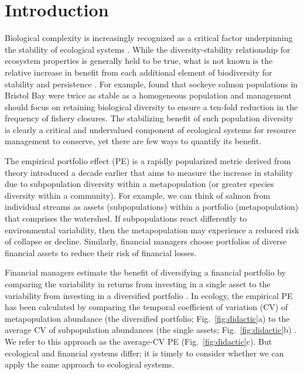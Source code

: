 
\section{Introduction}

Biological complexity is increasingly recognized as a critical factor
underpinning the stability of ecological systems
\citep[e.g.][]{hilborn2003, ives2007, schindler2010}.
While the diversity-stability relationship for ecosystem properties is
generally held to be true, what is not known is the relative increase in
benefit from each additional element of biodiversity for stability and
persistence \citep{cardinale2012}. For example,
\citet{schindler2010} found that sockeye salmon populations in Bristol Bay
were twice as stable as a homogeneous population and management should focus on
retaining biological diversity to ensure a ten-fold reduction in the frequency of
fishery closures. The stabilizing benefit of such population diversity is
clearly a critical and undervalued component of ecological systems for resource
management to conserve, yet there are few ways to quantify its benefit.

The empirical portfolio effect (PE) is a rapidly popularized metric
\citep[e.g.][]{schindler2010, carlson2011, iMCC2011} derived from
theory introduced a decade earlier \citep{doak1998, tilman1998,
tilman1999} that aims to measure the increase in stability due to
subpopulation diversity within a metapopulation (or greater species diversity
within a community). For example, we can think of salmon from individual streams
as assets (subpopulations) within a portfolio (metapopulation) that comprises
the watershed. If subpopulations react differently to environmental
variability, then the metapopulation may experience a reduced risk of collapse
or decline. Similarly, financial managers choose portfolios of diverse
financial assets to reduce their risk of financial losses.

Financial managers estimate the benefit of diversifying a
financial portfolio by comparing the variability in returns from investing in a
single asset to the variability from investing in a diversified portfolio
\citep{markowitz1959}. In ecology, the empirical PE has been calculated by
comparing the temporal coefficient of variation (CV) of metapopulation abundance
(the diversified portfolio; Fig.~\ref{fig:didactic}a) to the average CV of
subpopulation abundances (the single assets; Fig.~\ref{fig:didactic}b)
\citep{secor2009, schindler2010, carlson2011}. We refer to this
approach as the average-CV PE (Fig.~\ref{fig:didactic}c). But ecological and
financial systems differ; it is timely to consider whether we can apply the same
approach to ecological systems.

